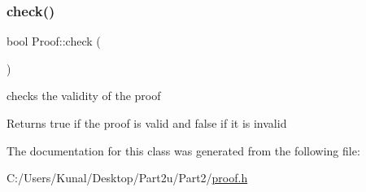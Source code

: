 \subsubsection{\texorpdfstring{check()}{check()}}
{\footnotesize\ttfamily bool Proof\+::check (\begin{DoxyParamCaption}{ }\end{DoxyParamCaption})\hspace{0.3cm}{\ttfamily [inline]}}



checks the validity of the proof 

\begin{DoxyReturn}{Returns}
true if the proof is valid and false if it is invalid 
\end{DoxyReturn}


The documentation for this class was generated from the following file\+:\begin{DoxyCompactItemize}
\item 
C\+:/\+Users/\+Kunal/\+Desktop/\+Part2u/\+Part2/\mbox{\hyperlink{proof_8h}{proof.\+h}}\end{DoxyCompactItemize}
